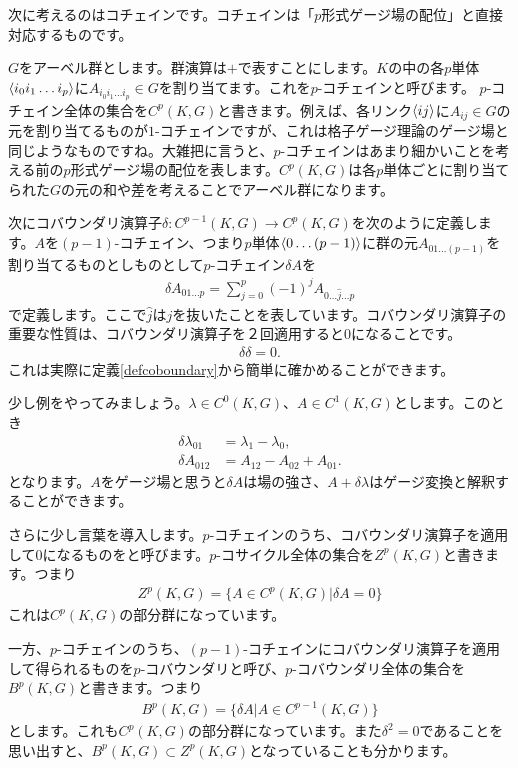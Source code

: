 \documentclass[generalized_symmetry.tex]{subfiles}
\begin{document}
次に考えるのはコチェインです。コチェインは「$p$形式ゲージ場の配位」と直接対応するものです。

$G$をアーベル群とします。群演算は$+$で表すことにします。$K$の中の各$p$単体$\expval{i_0i_1\dots i_p}$に$A_{i_0i_1\dots i_p}\in G$を割り当てます。これを$p$-コチェインと呼びます。
$p$-コチェイン全体の集合を$C^p(K,G)$と書きます。例えば、各リンク$\expval{ij}$に$A_{ij}\in G$の元を割り当てるものが$1$-コチェインですが、これは格子ゲージ理論のゲージ場と同じようなものですね。大雑把に言うと、$p$-コチェインはあまり細かいことを考える前の$p$形式ゲージ場の配位を表します。$C^p(K,G)$は各$p$単体ごとに割り当てられた$G$の元の和や差を考えることでアーベル群になります。

次にコバウンダリ演算子$\delta:C^{p-1}(K,G)\to C^{p}(K,G)$を次のように定義します。$A$を$(p-1)$-コチェイン、つまり$p$単体$\expval{0\dots(p-1)}$に群の元$A_{01\dots (p-1)}$を割り当てるものとしものとして$p$-コチェイン$\delta A$を
\begin{align}
    \delta A_{01\dots p} = \sum_{j=0}^{p} (-1)^{j} A_{0\dots \hat{j} \dots p}
    \label{defcoboundary}
\end{align}
で定義します。ここで$\hat{j}$は$j$を抜いたことを表しています。コバウンダリ演算子の重要な性質は、コバウンダリ演算子を２回適用すると$0$になることです。
\begin{align}
    \delta \delta = 0.
\end{align}
これは実際に定義\eqref{defcoboundary}から簡単に確かめることができます。

少し例をやってみましょう。$\lambda \in C^0(K,G)$、$A \in C^1(K,G)$とします。このとき
\begin{align}
    \delta \lambda_{01} &= \lambda_{1}-\lambda_{0},\\
    \delta A_{012} & = A_{12} - A_{02} + A_{01}.
\end{align}
となります。$A$をゲージ場と思うと$\delta A$は場の強さ、$A+\delta \lambda$はゲージ変換と解釈することができます。

さらに少し言葉を導入します。$p$-コチェインのうち、コバウンダリ演算子を適用して$0$になるものをと呼びます。$p$-コサイクル全体の集合を$Z^p(K,G)$と書きます。つまり
\begin{align}
    Z^p(K,G) = \{A\in C^p(K,G) | \delta A = 0\}
\end{align}
これは$C^p(K,G)$の部分群になっています。

一方、$p$-コチェインのうち、$(p-1)$-コチェインにコバウンダリ演算子を適用して得られるものを$p$-コバウンダリと呼び、$p$-コバウンダリ全体の集合を$B^p(K,G)$と書きます。つまり
\begin{align}
    B^p(K,G) = \{\delta A | A\in C^{p-1}(K,G)\}
\end{align}
とします。これも$C^p(K,G)$の部分群になっています。また$\delta^2=0$であることを思い出すと、$B^p(K,G)\subset Z^p(K,G)$となっていることも分かります。
\end{document}
